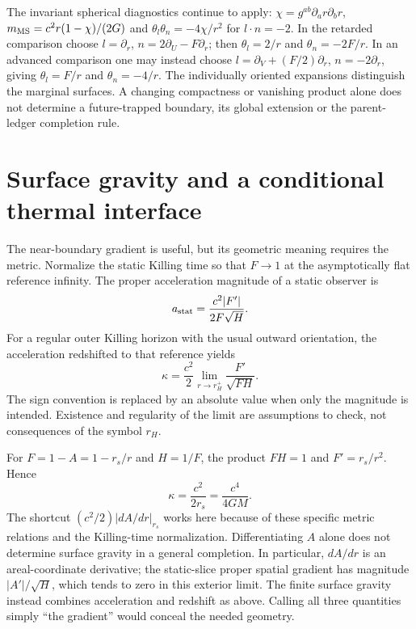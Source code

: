 \documentclass[10pt,twocolumn,letterpaper]{article}
\begin{document}
The invariant spherical diagnostics continue to apply:
$\chi=g^{ab}\partial_ar\partial_br$,
$m_{\rm MS}=c^2r(1-\chi)/(2G)$ and
$\theta_l\theta_n=-4\chi/r^2$ for $l\cdot n=-2$.
In the retarded comparison choose
$l=\partial_r$, $n=2\partial_U-F\partial_r$; then
$\theta_l=2/r$ and $\theta_n=-2F/r$.
In an advanced comparison one may instead choose
$l=\partial_V+(F/2)\partial_r$, $n=-2\partial_r$,
giving $\theta_l=F/r$ and $\theta_n=-4/r$.
The individually oriented expansions distinguish the marginal surfaces.
A changing compactness or vanishing product alone does not determine a
future-trapped boundary, its global extension or the parent-ledger
completion rule.


\section{Surface gravity and a conditional thermal interface}
\label{sec:thermal-interface}
The near-boundary gradient is useful, but its geometric meaning requires the metric. Normalize the static Killing time so that $F\to1$ at the asymptotically flat reference infinity. The proper acceleration magnitude of a static observer is
\[
 a_{\rm stat}=\frac{c^2|F'|}{2F\sqrt H}.
\]
For a regular outer Killing horizon with the usual outward orientation, the acceleration redshifted to that reference yields
\begin{equation}
 \kappa=\frac{c^2}{2}\lim_{r\to r_H^+}
 \frac{F'}{\sqrt{FH}}.
 \label{eq:closure-kappa}
\end{equation}
The sign convention is replaced by an absolute value when only the magnitude is intended. Existence and regularity of the limit are assumptions to check, not consequences of the symbol $r_H$.

For $F=1-A=1-r_s/r$ and $H=1/F$, the product $FH=1$ and $F'=r_s/r^2$. Hence
\[
 \kappa=\frac{c^2}{2r_s}=\frac{c^4}{4GM}.
\]
The shortcut $(c^2/2)|dA/dr|_{r_s}$ works here because of these specific metric relations and the Killing-time normalization. Differentiating $A$ alone does not determine surface gravity in a general completion. In particular, $dA/dr$ is an areal-coordinate derivative; the static-slice proper spatial gradient has magnitude $|A'|/\sqrt H$, which tends to zero in this exterior limit. The finite surface gravity instead combines acceleration and redshift as above. Calling all three quantities simply ``the gradient'' would conceal the needed geometry.
\end{document}
